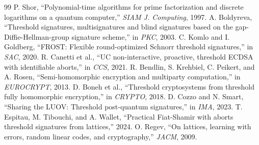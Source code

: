 \documentclass[11pt,a4paper]{article}
\begin{document}
\begin{thebibliography}{99}
 P. Shor, ``Polynomial-time algorithms for prime factorization and discrete logarithms on a quantum computer,'' \emph{SIAM J. Computing}, 1997.
 A. Boldyreva, ``Threshold signatures, multisignatures and blind signatures based on the gap-Diffie-Hellman-group signature scheme,'' in \emph{PKC}, 2003.
 C. Komlo and I. Goldberg, ``FROST: Flexible round-optimized Schnorr threshold signatures,'' in \emph{SAC}, 2020.
 R. Canetti et al., ``UC non-interactive, proactive, threshold ECDSA with identifiable aborts,'' in \emph{CCS}, 2021.
 R. Bendlin, S. Krehbiel, C. Peikert, and A. Rosen, ``Semi-homomorphic encryption and multiparty computation,'' in \emph{EUROCRYPT}, 2013.
 D. Boneh et al., ``Threshold cryptosystems from threshold fully homomorphic encryption,'' in \emph{CRYPTO}, 2018.
 D. Cozzo and N. Smart, ``Sharing the LUOV: Threshold post-quantum signatures,'' in \emph{IMA}, 2023.
 T. Espitau, M. Tibouchi, and A. Wallet, ``Practical Fiat-Shamir with aborts threshold signatures from lattices,'' 2024.
 O. Regev, ``On lattices, learning with errors, random linear codes, and cryptography,'' \emph{JACM}, 2009.
\end{thebibliography}
\end{document}
